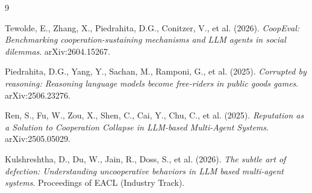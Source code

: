 \documentclass[12pt,a4paper]{article}
\begin{document}
\begin{thebibliography}{9}

Tewolde, E., Zhang, X., Piedrahita, D.G., Conitzer, V., et al. (2026). \textit{CoopEval: Benchmarking cooperation-sustaining mechanisms and LLM agents in social dilemmas}. arXiv:2604.15267.

Piedrahita, D.G., Yang, Y., Sachan, M., Ramponi, G., et al. (2025). \textit{Corrupted by reasoning: Reasoning language models become free-riders in public goods games}. arXiv:2506.23276.

Ren, S., Fu, W., Zou, X., Shen, C., Cai, Y., Chu, C., et al. (2025). \textit{Reputation as a Solution to Cooperation Collapse in LLM-based Multi-Agent Systems}. arXiv:2505.05029.

Kulshreshtha, D., Du, W., Jain, R., Doss, S., et al. (2026). \textit{The subtle art of defection: Understanding uncooperative behaviors in LLM based multi-agent systems}. Proceedings of EACL (Industry Track).

\end{thebibliography}
\end{document}
